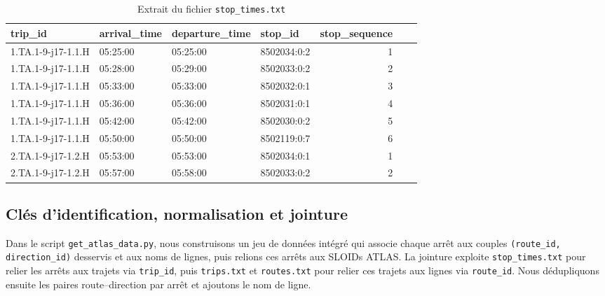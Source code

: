 \begin{itemize}
    \begin{table}[H]
    \caption{Extrait du fichier \texttt{stop\_times.txt}}
    \label{tab:stop_times}
    \centering
    \begin{tabular}{l l l l r l l}
    \toprule
    trip\_id & arrival\_time & departure\_time & stop\_id & stop\_sequence \\
    \midrule
    1.TA.1-9-j17-1.1.H & 05:25:00 & 05:25:00 & 8502034:0:2 & 1 \\
    1.TA.1-9-j17-1.1.H & 05:28:00 & 05:29:00 & 8502033:0:2 & 2 \\
    1.TA.1-9-j17-1.1.H & 05:33:00 & 05:33:00 & 8502032:0:1 & 3 \\
    1.TA.1-9-j17-1.1.H & 05:36:00 & 05:36:00 & 8502031:0:1 & 4 \\
    1.TA.1-9-j17-1.1.H & 05:42:00 & 05:42:00 & 8502030:0:2 & 5 \\
    1.TA.1-9-j17-1.1.H & 05:50:00 & 05:50:00 & 8502119:0:7 & 6 \\
    2.TA.1-9-j17-1.2.H & 05:53:00 & 05:53:00 & 8502034:0:1 & 1 \\
    2.TA.1-9-j17-1.2.H & 05:57:00 & 05:58:00 & 8502033:0:2 & 2 \\
    \bottomrule
    \end{tabular}
    \end{table}
\end{itemize}


\subsection{Clés d’identification, normalisation et jointure}

Dans le script \texttt{get\_atlas\_data.py}, nous construisons un jeu de données intégré qui associe chaque arrêt aux couples \texttt{(route\_id, direction\_id)} desservis et aux noms de lignes, puis relions ces arrêts aux SLOIDs ATLAS. La jointure exploite \texttt{stop\_times.txt} pour relier les arrêts aux trajets via \texttt{trip\_id}, puis \texttt{trips.txt} et \texttt{routes.txt} pour relier ces trajets aux lignes via \texttt{route\_id}. Nous dédupliquons ensuite les paires route–direction par arrêt et ajoutons le nom de ligne.

